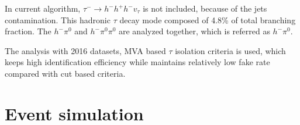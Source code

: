 In current algorithm, $\tau^{-}\to h^{-}h^{+}h^{-}v_{\tau}$ is not included, because of the jets contamination. This hadronic $\tau$ decay mode composed of 4.8\% of total branching fraction. The $h^{-}\pi^{0}$ and $h^{-}\pi^{0}\pi^{0}$ are analyzed together, which is referred as $h^{-}\pi^{0}$.

The analysis with 2016 datasets, MVA based $\tau$ isolation criteria is used, which keeps high identification efficiency while maintains relatively low fake rate compared with cut based criteria.

\section{Event simulation}

